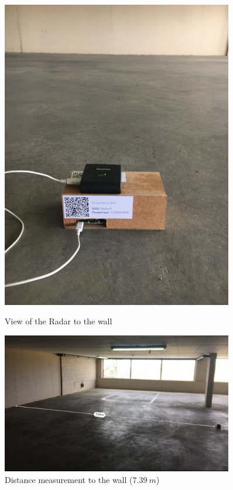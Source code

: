 \begin{figure}[h!]
    \centering
    \begin{minipage}{0.45\textwidth}
        \centering
        \includegraphics[width = 0.9\textwidth]{images/setupPDresults.pdf}
    \caption{View of the Radar to the wall}\label{fig:setupPDresults}
    \end{minipage}\hfill
    \begin{minipage}{0.45\textwidth}
        \centering
        \includegraphics[width = 0.9\textwidth]{images/setupPDresults1.pdf}
    \caption{Distance measurement to the wall ($7.39\ m$)}\label{fig:setupPDresults1}
    \end{minipage}
\end{figure}

